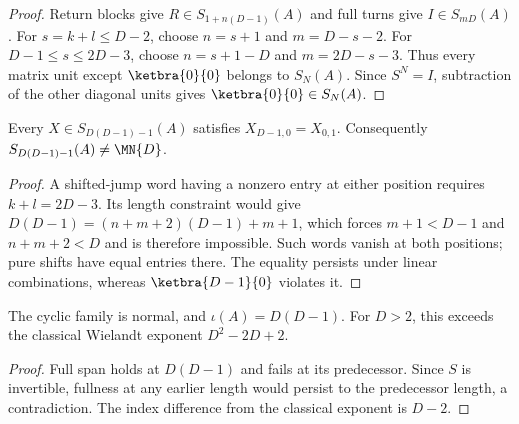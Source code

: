 \begin{proof}\leanok
    Return blocks give $R\in S_{1+n(D-1)}(A)$ and full turns give
    $I\in S_{mD}(A)$. For $s=k+l\le D-2$, choose $n=s+1$ and
    $m=D-s-2$. For $D-1\le s\le2D-3$, choose $n=s+1-D$ and
    $m=2D-s-3$. Thus every matrix unit except $\ketbra{0}{0}$ belongs
    to $S_N(A)$. Since $S^N=I$, subtraction of the other diagonal units
    gives $\ketbra{0}{0}\in S_N(A)$.
\end{proof}

\begin{lemma}
    \label{thm:cyclic_wielandt_predecessor}
    \leanok
    Every $X\in S_{D(D-1)-1}(A)$ satisfies $X_{D-1,0}=X_{0,1}$.
    Consequently $S_{D(D-1)-1}(A)\ne\MN{D}$.
\end{lemma}

\begin{proof}\leanok
    A shifted-jump word having a nonzero entry at either position
    requires $k+l=2D-3$. Its length constraint would give
    $D(D-1)=(n+m+2)(D-1)+m+1$, which forces $m+1<D-1$ and
    $n+m+2<D$ and is therefore impossible. Such words vanish at both
    positions; pure shifts have equal entries there. The equality
    persists under linear combinations, whereas $\ketbra{D-1}{0}$
    violates it.
\end{proof}

\begin{lemma}
    \label{thm:cyclic_wielandt_index}
    \leanok
    The cyclic family is normal, and
    $\iota(A)=D(D-1)$. For $D>2$, this exceeds the classical
    Wielandt exponent $D^2-2D+2$.
\end{lemma}

\begin{proof}\leanok
    Full span holds at $D(D-1)$ and fails at its predecessor. Since
    $S$ is invertible, fullness at any earlier length would persist
    to the predecessor length, a contradiction. The index difference
    from the classical exponent is $D-2$.
\end{proof}
